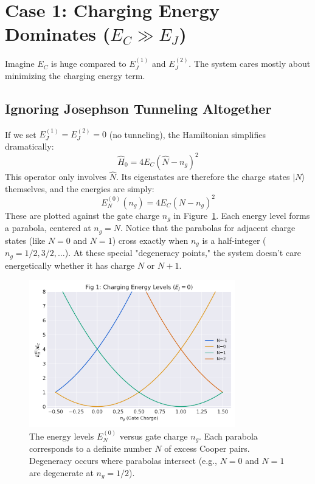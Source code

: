 \documentclass{book}
\begin{document}
\section[Case 1: Charging Energy Dominates]{Case 1: Charging Energy Dominates (\(E_C \gg E_J\))}
\label{sec:charge_regime}

Imagine \(E_C\) is huge compared to \(E_J^{(1)}\) and \(E_J^{(2)}\). The system cares mostly about minimizing the charging energy term.

\subsection{Ignoring Josephson Tunneling Altogether}
\label{subsec:pure_charging}

If we set \(E_J^{(1)} = E_J^{(2)} = 0\) (no tunneling), the Hamiltonian simplifies dramatically:
\begin{equation}
\hat{H}_0 = 4 E_C (\hat{N} - n_g)^2
\end{equation}
This operator only involves \(\hat{N}\). Its eigenstates are therefore the charge states \(|N\rangle\) themselves, and the energies are simply:
\begin{equation}
E_N^{(0)}(n_g) = 4 E_C (N - n_g)^2
\label{eq:E_N_0}
\end{equation}
These are plotted against the gate charge \(n_g\) in Figure~\ref{fig:charging_levels}. Each energy level forms a parabola, centered at \(n_g = N\). Notice that the parabolas for adjacent charge states (like \(N=0\) and \(N=1\)) cross exactly when \(n_g\) is a half-integer (\(n_g = 1/2, 3/2, \dots\)). At these special "degeneracy points," the system doesn't care energetically whether it has charge \(N\) or \(N+1\).

\begin{figure}[h]
    \centering
    \includegraphics[width=0.8\textwidth]{fig_charge_levels.png}
    \caption[Charging energy levels vs. gate charge]{The energy levels \(E_N^{(0)}\) versus gate charge \(n_g\). Each parabola corresponds to a definite number \(N\) of excess Cooper pairs. Degeneracy occurs where parabolas intersect (e.g., \(N=0\) and \(N=1\) are degenerate at \(n_g=1/2\)).}
    \label{fig:charging_levels}
\end{figure}
\end{document}
